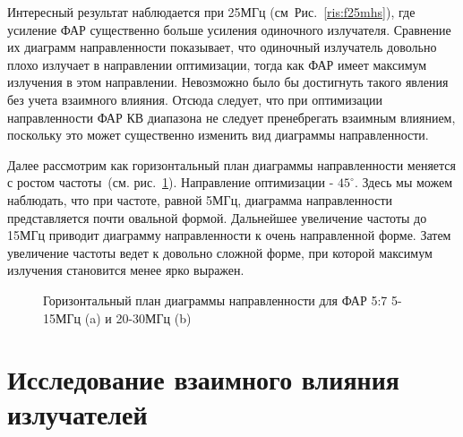 Интересный результат наблюдается при 25МГц (см~Рис.~\ref{ris:f25mhs}), где усиление ФАР существенно больше усиления одиночного излучателя. Сравнение их диаграмм направленности показывает, что одиночный излучатель довольно плохо излучает в направлении оптимизации, тогда как ФАР имеет максимум излучения в этом направлении. Невозможно было бы достигнуть такого явления без учета взаимного влияния. Отсюда следует, что при оптимизации направленности ФАР КВ диапазона не следует пренебрегать взаимным влиянием, поскольку это может существенно изменить вид диаграммы направленности.

Далее рассмотрим как горизонтальный план диаграммы направленности меняется с ростом частоты~(см. рис.~\ref{ris:horizontal}). Направление оптимизации - $45^{\circ}$. Здесь мы можем наблюдать, что при частоте, равной 5МГц, диаграмма направленности представляется почти овальной формой. Дальнейшее увеличение частоты до 15МГц приводит диаграмму направленности к очень направленной форме. Затем увеличение частоты ведет к довольно сложной форме, при которой максимум излучения становится менее ярко выражен.

\begin{figure}
\begin{minipage}[h]{0.49\linewidth}
\end{minipage}
\hfill
\begin{minipage}[h]{0.49\linewidth}
\end{minipage}
\caption{Горизонтальный план диаграммы направленности для ФАР 5:7 5-15МГц (a) и 20-30МГц (b)}
\label{ris:horizontal}
\end{figure}

\section{Исследование взаимного влияния излучателей} 

